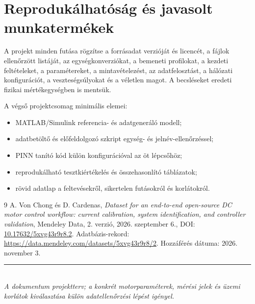 \documentclass[11pt,a4paper]{article}
\begin{document}
\section{Reprodukálhatóság és javasolt munkatermékek}

A projekt minden futása rögzítse a forrásadat verzióját és licencét, a fájlok ellenőrzött listáját, az egységkonverziókat, a bemeneti profilokat, a kezdeti feltételeket, a paramétereket, a mintavételezést, az adatfelosztást, a hálózati konfigurációt, a veszteségsúlyokat és a véletlen magot. A becsléseket eredeti fizikai mértékegységben is mentsük.

A végső projektcsomag minimális elemei:
\begin{itemize}
  \item MATLAB/Simulink referencia- és adatgeneráló modell;
  \item adatbetöltő és előfeldolgozó szkript egység- és jelnév-ellenőrzéssel;
  \item PINN tanító kód külön konfigurációval az öt lépcsőhöz;
  \item reprodukálható tesztkiértékelés és összehasonlító táblázatok;
  \item rövid adatlap a feltevésekről, sikertelen futásokról és korlátokról.
\end{itemize}

\begin{thebibliography}{9}
A. Von Chong és D. Cardenas,
\emph{Dataset for an end-to-end open-source DC motor control workflow: current calibration, system identification, and controller validation},
Mendeley Data, 2. verzió, 2026. szeptember 6.,
DOI: \href{https://doi.org/10.17632/5xvg43r9r8.2}{10.17632/5xvg43r9r8.2}.
Adatbázis-rekord: \url{https://data.mendeley.com/datasets/5xvg43r9r8/2}.
Hozzáférés dátuma: 2026. november 3.
\end{thebibliography}

\vfill
\begin{center}
\color{navy}\rule{0.65\textwidth}{0.5pt}\\
\textit{A dokumentum projektterv; a konkrét motorparaméterek, mérési jelek és üzemi korlátok kiválasztása külön adatellenőrzési lépést igényel.}
\end{center}
\end{document}
